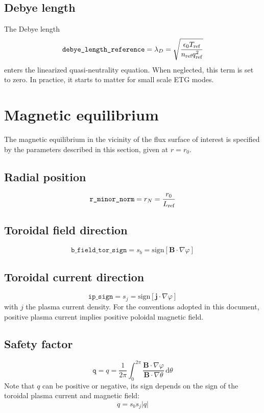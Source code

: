 \documentclass[a4paper]{report}
\begin{document}
\subsection{Debye length} \label{sec:debye}
The Debye length
\begin{equation}
\texttt{debye\_length\_reference}=\lambda_{D}= \sqrt{\frac{\epsilon_0 T_{\textrm{ref}}}{n_{\textrm{ref}} q_{\textrm{ref}}^2}}
\end{equation}
enters the linearized quasi-neutrality equation. When neglected, this term is set to zero. In practice, it starts to matter for small scale ETG modes. 


\section{Magnetic equilibrium}
The magnetic equilibrium in the vicinity of the flux surface of interest is specified by the parameters described in this section, given at $r=r_0$.

\subsection{Radial position} \label{sec:rminor}
$$\texttt{r\_minor\_norm}=r_N=\frac{r_0}{L_{\textrm{ref}}}$$


\subsection{Toroidal field direction} \label{sec:btsign}
$$\texttt{b\_field\_tor\_sign}=s_b = \textrm{sign}[\mathbf{B}\cdot\nabla\varphi]$$

\subsection{Toroidal current direction} \label{sec:ipsign}
$$\texttt{ip\_sign}=s_j = \textrm{sign}[\mathbf{j}\cdot\nabla\varphi]$$
with $j$ the plasma current density. For the conventions adopted in this document, positive plasma current implies positive poloidal magnetic field.

\subsection{Safety factor} \label{sec:q}
$$\texttt{q}=q=\frac{1}{2\pi}\int_0^{2\pi} \frac{\mathbf{B}\cdot\nabla \varphi}{\mathbf{B}\cdot\nabla \theta}\,\textrm{d}\theta$$
Note that $q$ can be positive or negative, its sign depends on the sign of the toroidal plasma current and magnetic field:
$$q = s_b s_j |q|$$
\end{document}
